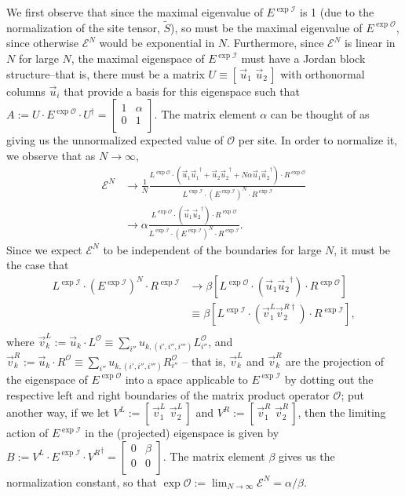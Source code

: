 \documentclass[12pt]{amsbook}
\theoremstyle{plain}
\theoremstyle{definition}
\theoremstyle{remark}
\newcommand{\bmat}[4]{
\begin{bmatrix}
#1 & #2\\
#3 & #4\\
\end{bmatrix}
}
\newcommand{\paren}[1]{\left(#1\right)}
\newcommand{\mexp}[1]{\exp{\mathcal{#1}}}
\begin{document}
We first observe that since the maximal eigenvalue of $E^{\mexp{I}}$ is 1 (due to the normalization of the site tensor, $\tilde S$), so must be the maximal eigenvalue of $E^{\mexp{O}}$, since otherwise $\mathcal{E}^N$ would be exponential in $N$.  Furthermore, since $\mathcal{E}^N$ is linear in $N$ for large $N$, the maximal eigenspace of $E^{\mexp{I}}$ must have a Jordan block structure--that is, there must be a matrix $U\equiv[\,\vec{u}_1\,\,\vec{u}_2\,]$  with orthonormal columns $\vec{u}_i$ that provide a basis for this eigenspace such that $A:=U \cdot E^{\mexp{O}} \cdot U^\dagger = \bmat{1}{\alpha}{0}{1}.$ The matrix element $\alpha$ can be thought of as giving us the unnormalized expected value of $\mathcal{O}$ per site.  In order to normalize it, we observe that as $N\to\infty$,
$$
\begin{aligned}
\mathcal{E}^N&\to
\frac{1}{N}\frac{L^{\mexp{O}} \cdot \paren{\vec{u}_1 {\vec{u}_1}^\dagger + \vec{u}_2 {\vec{u}_2}^\dagger + N\alpha \vec{u}_1{\vec{u}_2}^\dagger}\cdot R^{\mexp{O}}}{L^{\mexp{I}} \cdot \paren{E^{\mexp{I}}}^N \cdot R^{\mexp{I}}} \\
& \to
\alpha\frac{L^{\mexp{O}} \cdot (\vec{u}_1 {\vec{u}_2}^\dagger) \cdot R^{\mexp{O}}}{L^{\mexp{I}} \cdot \paren{E^{\mexp{I}}}^N \cdot R^{\mexp{I}}}.
\end{aligned}$$
Since we expect $\mathcal{E}^N$ to be independent of the boundaries for large $N$, it must be the case that $$
\begin{aligned}
L^{\mexp{I}} \cdot \paren{E^{\mexp{I}}}^N \cdot R^{\mexp{I}}
&\to \beta \left[ L^{\mexp{O}} \cdot (\vec{u}_1{\vec{u}_2}^\dagger) \cdot R^{\mexp{O}}\right]\\
&\equiv \beta \left[L^{\mexp{I}} \cdot (\vec{v}^L_1 \vec{v}^{R\dagger}_2) \cdot R^{\mexp{I}}\right], \\
\end{aligned}
$$ where $\vec{v}^L_{k} :=  \vec{u}_k \cdot L^{\mathcal{O}} \equiv \sum_{i''} u_{k,(i',i'',i''')} L^{\mathcal{O}}_{i''}$, and $\vec{v}^R_{k} :=  \vec{u}_k \cdot R^{\mathcal{O}} \equiv \sum_{i''} u_{k,(i',i'',i''')} R^{\mathcal{O}}_{i''}$ -- that is, $\vec{v}^L_k$ and $\vec{v}^R_k$ are the projection of the eigenspace of $E^{\mexp{O}}$ into a space applicable to $E^{\mexp{I}}$ by dotting out the respective left and right boundaries of the matrix product operator $\mathcal{O}$; put another way, if we let $V^L:=[\,\vec{v}^L_1\,\,\vec{v}^L_2\,]$ and $V^R:=[\,\vec{v}^R_1\,\,\vec{v}^R_2\,]$, then the limiting action of $E^{\mexp{I}}$ in the (projected) eigenspace is given by $B:=V^L \cdot E^{\mexp{I}} \cdot {V^R}^\dagger = \bmat{0}{\beta}{0}{0}$.  The matrix element $\beta$ gives us the normalization constant, so that $\mexp{O}:=\lim_{N\to\infty}\mathcal{E}^N=\alpha/\beta$.
\end{document}
